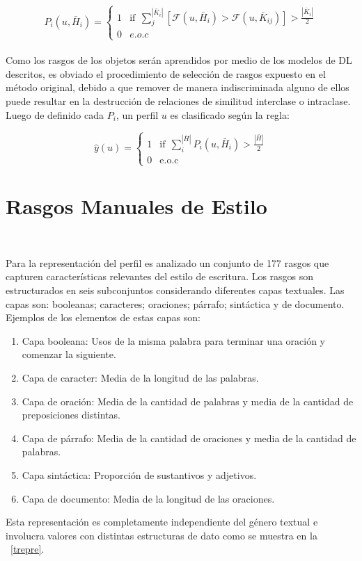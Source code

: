 	\begin{equation*}
	 	P_i(u,  \bar{H}_i) = 
	 	\begin{cases}
	 		1 & \text{if}~~ \sum\limits_{j}^{|\bar{K}_{i}|}[\mathcal{F}(u, \bar{H}_i) > \mathcal{F}(u, \bar{K}_{ij})] > \frac{|\bar{K}_{i}|}{2}\\
	 		0 & e.o.c
	 	\end{cases}
	 \end{equation*}	  
	 \\
	 Como los rasgos de los objetos serán aprendidos por medio de los modelos de DL descritos, es obviado el procedimiento de selección de rasgos expuesto en el método original, debido a que remover de manera indiscriminada alguno de ellos puede resultar en la destrucción de relaciones de similitud interclase o intraclase.
	 \\
	 Luego de definido cada $P_i$, un perfil $u$ es clasificado según la regla:
	 
	\begin{equation*}
	 	\hat{y}(u)  = 
	 	\begin{cases}
	 		1 & \text{if}~~ \sum\limits_{i}^{|\bar{H}|} P_i(u, \bar{H}_i) > \frac{|\bar{H}|}{2}\\
	 		0 & \text{e.o.c}
	 	\end{cases}
	 \end{equation*}	
	 
	 
	 \section{Rasgos Manuales de Estilo}~\label{syle_feat}
	 
	 Para la representación del perfil es analizado un conjunto de 177 rasgos que capturen características relevantes del estilo de escritura. Los rasgos son estructurados en seis subconjuntos considerando diferentes capas textuales. Las capas son: booleanas; caracteres; oraciones; párrafo; sintáctica y de documento.
	 \\
	 Ejemplos de los elementos de estas capas son:	 \\
	 \begin{enumerate}
	 	\item Capa booleana: Usos de la misma palabra para terminar una oración y comenzar la siguiente.
	 	\item Capa de caracter: Media de la longitud de las palabras.
	 	\item Capa de oración: Media de la cantidad de palabras y media de la cantidad de preposiciones distintas.
	 	\item Capa de párrafo: Media de la cantidad de oraciones y media de la cantidad de palabras.
	 	\item Capa sintáctica: Proporción de sustantivos y adjetivos.
	 	\item Capa de documento: Media de la longitud de las oraciones.
	 \end{enumerate}
	 Esta representación es completamente independiente del género textual e involucra valores con distintas estructuras de dato como se muestra en la \figurename~\ref{trepre}.

